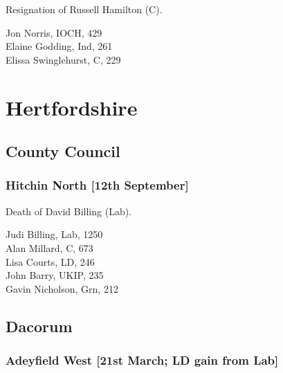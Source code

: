 \documentclass[a4paper,openany,10pt]{book}
\begin{document}
Resignation of Russell Hamilton (C).



Jon Norris, IOCH, 429\\
Elaine Godding, Ind, 261\\
Elissa Swinglehurst, C, 229\\


\vfill

\section[Hertfordshire]{{Hertfordshire}}

\subsection*{County Council}

\subsubsection*{Hitchin North \hspace*{\fill}\nolinebreak[1]%
\enspace\hspace*{\fill}
[12th September]}


Death of David Billing (Lab).



Judi Billing, Lab, 1250\\
Alan Millard, C, 673\\
Lisa Courts, LD, 246\\
John Barry, UKIP, 235\\
Gavin Nicholson, Grn, 212\\


\subsection*{Dacorum}

\subsubsection*{Adeyfield West \hspace*{\fill}\nolinebreak[1]%
\enspace\hspace*{\fill}
[21st March; LD gain from Lab]}

\end{document}

